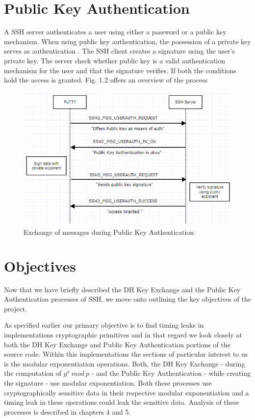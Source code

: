 \documentclass{report}
\begin{document}
\section{Public Key Authentication}
A SSH server authenticates a user using either a password or a public key mechanism. When using public key authentication, the possession of a private key serves as authentication \cite{rfc4252}. The SSH client creates a signature using the user's private key. The server check whether public key is a valid authentication mechanism for the user and that the signature verifies. If both the conditions hold the access is granted. Fig. 1.2 offers an overview of the process\par
\begin{figure}[ht]
\caption{Exchange of messages during Public Key Authentication}
\centering
\includegraphics[width=1\textwidth]{SSH_PK_Auth.png}
\end{figure}
\section{Objectives}
\par
Now that we have briefly described the DH Key Exchange and the Public Key Authentication processes of SSH, we move onto outlining the key objectives of the project.\par
As specified earlier our primary objective is to find timing leaks in implementations cryptographic primitives and in that regard we look closely at both the DH Key Exchange and Public Key Authentication portions of the source code. Within this implementations the sections of particular interest to us is the modular exponentiation operations. Both, the DH Key Exchange - during the computation of \(g^a\ mod\ p\) - and the Public Key Authentication - while creating the signature - use modular exponentiation. Both these processes use cryptographically sensitive data in their respective modular exponentiation and a timing leak in these operations could leak the sensitive data. Analysis of these processes is described in chapters 4 and 5.\par
\end{document}
